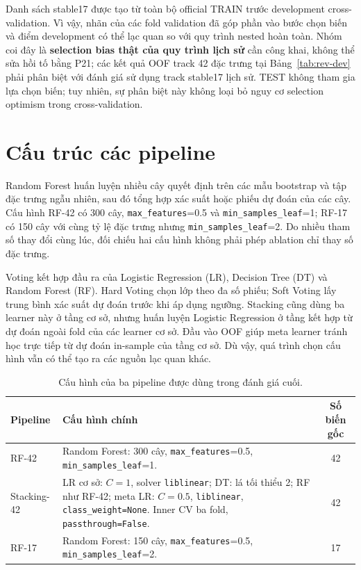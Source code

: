 Danh sách stable17 được tạo từ toàn bộ official TRAIN trước development cross-validation. Vì vậy, nhãn của các fold validation đã góp phần vào bước chọn biến và điểm development có thể lạc quan so với quy trình nested hoàn toàn. Nhóm coi đây là \textbf{selection bias thật của quy trình lịch sử} cần công khai, không thể sửa hồi tố bằng P21; các kết quả OOF track 42 đặc trưng tại Bảng~\ref{tab:rev-dev} phải phân biệt với đánh giá sử dụng track stable17 lịch sử. TEST không tham gia lựa chọn biến; tuy nhiên, sự phân biệt này không loại bỏ nguy cơ selection optimism trong cross-validation.

\section{Cấu trúc các pipeline}
\label{sec:method-pipelines}

Random Forest huấn luyện nhiều cây quyết định trên các mẫu bootstrap và tập đặc trưng ngẫu nhiên, sau đó tổng hợp xác suất hoặc phiếu dự đoán của các cây. Cấu hình RF-42 có 300 cây, \texttt{max\_features}=0.5 và \texttt{min\_samples\_leaf}=1; RF-17 có 150 cây với cùng tỷ lệ đặc trưng nhưng \texttt{min\_samples\_leaf}=2. Do nhiều tham số thay đổi cùng lúc, đối chiếu hai cấu hình không phải phép ablation chỉ thay số đặc trưng.

Voting kết hợp đầu ra của Logistic Regression (LR), Decision Tree (DT) và Random Forest (RF). Hard Voting chọn lớp theo đa số phiếu; Soft Voting lấy trung bình xác suất dự đoán trước khi áp dụng ngưỡng. Stacking cũng dùng ba learner này ở tầng cơ sở, nhưng huấn luyện Logistic Regression ở tầng kết hợp từ dự đoán ngoài fold của các learner cơ sở. Đầu vào OOF giúp meta learner tránh học trực tiếp từ dự đoán in-sample của tầng cơ sở. Dù vậy, quá trình chọn cấu hình vẫn có thể tạo ra các nguồn lạc quan khác.

\begin{table}[htbp]
\centering
\small
\renewcommand{\arraystretch}{1.3}
\setlength{\tabcolsep}{6pt}
\caption{Cấu hình của ba pipeline được dùng trong đánh giá cuối.}
\label{tab:frozen-candidates}
\begin{tabularx}{\linewidth}{>{\raggedright\arraybackslash}p{2.5cm}X S[table-format=2.0]}
\toprule
Pipeline & Cấu hình chính & {Số biến gốc}\\
\midrule
RF-42 & Random Forest: 300 cây, \texttt{max\_features}=0.5, \texttt{min\_samples\_leaf}=1. & 42\\
Stacking-42 & LR cơ sở: $C=1$, solver \texttt{liblinear}; DT: lá tối thiểu 2; RF như RF-42; meta LR: $C=0.5$, \texttt{liblinear}, \texttt{class\_weight=None}. Inner CV ba fold, \texttt{passthrough=False}. & 42\\
RF-17 & Random Forest: 150 cây, \texttt{max\_features}=0.5, \texttt{min\_samples\_leaf}=2. & 17\\
\bottomrule
\end{tabularx}
\end{table}


